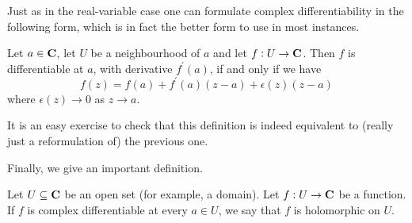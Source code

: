 Just as in the real-variable case one can formulate complex differentiability in the following form, which is in fact the better form to use in most instances.

\begin{lemma}
Let $a\in\mathbf C$, let $U$ be a neighbourhood of $a$ and let $f:U\to\mathbf C$. Then $f$ is differentiable at $a$, with derivative $f^\prime(a)$, if and only if we have
\begin{equation}
f(z)=f(a)+f^\prime(a)(z-a)+\epsilon(z)(z-a)
\end{equation}
where $\epsilon(z)\to0$ as $z\to a$.
\end{lemma}

It is an easy exercise to check that this definition is indeed equivalent to (really just a reformulation of) the previous one.

Finally, we give an important definition.

\begin{definition}
Let $U\subseteq\mathbf C$ be an open set (for example, a domain). Let $f:U\to\mathbf C$ be a function. If $f$ is complex differentiable at every $a\in U$, we say that $f$ is holomorphic on $U$.
\end{definition}

\begin{comment}
\begin{definition}[Continuity]
$f:\Omega\to\CC$ for $\Omega\subset\CC$ open is \vocab{continuous} at $z_0$ if $\displaystyle\lim_{z\to z_0}=f(z_0)$.
\end{definition}

\begin{proposition}
$f$ is continuous if and only if $f$ is continuous at all $a\in\Omega$.
\end{proposition}

\begin{proposition}
If $f,g:\Omega\to\CC$ are continuous, then so are $f+g$, $fg$ and $f/g$ (where the last one is defined over $\Omega\setminus\{x\mid g(x)=0\}$).
\end{proposition}

\begin{proposition}
An analytic function is continuous.
\end{proposition}

\begin{proof}
Suppose $f:\Omega\to\CC$ is analytic with derivative 
\[f^\prime(z)=\lim_{h\to0}\frac{f(z+h)-f(z)}{h}.\]
Then
\[\lim_{h\to0}\brac{f(z+h)-f(z)}=f^\prime(z)\lim_{h\to0}h=0.\]
\end{proof}
\end{comment}

